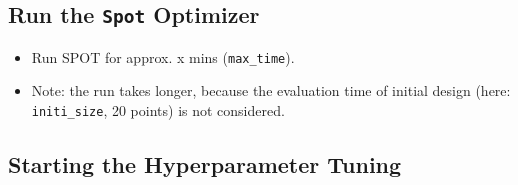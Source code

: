 \documentclass[
  letterpaper,
  DIV=11,
  numbers=noendperiod]{scrreprt}
\providecommand{\tightlist}{%
  \setlength{\itemsep}{0pt}\setlength{\parskip}{0pt}}\usepackage{longtable,booktabs,array}
\begin{document}
\hypertarget{run-the-spot-optimizer}{%
\subsection{\texorpdfstring{Run the \texttt{Spot}
Optimizer}{Run the Spot Optimizer}}\label{run-the-spot-optimizer}}

\begin{itemize}
\tightlist
\item
  Run SPOT for approx. x mins (\texttt{max\_time}).
\item
  Note: the run takes longer, because the evaluation time of initial
  design (here: \texttt{initi\_size}, 20 points) is not considered.
\end{itemize}

\hypertarget{sec-call-the-hyperparameter-tuner-10}{%
\subsection{Starting the Hyperparameter
Tuning}\label{sec-call-the-hyperparameter-tuner-10}}
\end{document}
